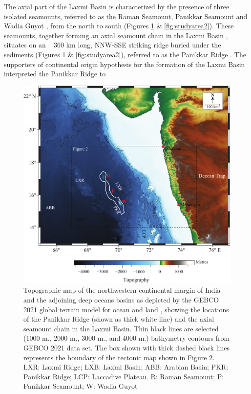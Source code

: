 \documentclass[twocolumn]{article}
\begin{document}
The axial part of the Laxmi Basin is characterized by the presence of three isolated seamounts, referred to as the Raman Seamount, Panikkar Seamount and Wadia Guyot \citep{Bhattacharya1994b}, from the north to south (Figures \ref{fig:studyarea} \& \ref{fig:studyarea2}). These seamounts, together forming an axial seamount chain in the Laxmi Basin \citep{Bhattacharya1994b}, situates on an ~ 360 km long, NNW-SSE striking ridge buried under the sediments (Figures \ref{fig:studyarea} \& \ref{fig:studyarea2}), referred to as the Panikkar Ridge \citep{Gopala_Rao1992}. The supporters of continental origin hypothesis for the formation of the Laxmi Basin interpreted the Panikkar Ridge to\begin{figure}[!htb]
	\centering
	\includegraphics[width=0.85\linewidth]{studyarea-bathy.pdf}
	\caption{
	Topographic map of the northwestern continental margin of India and the adjoining deep oceans basins as depicted by the GEBCO 2021 global terrain model for ocean and land \citep{GEBCO_Compilation_Group2021}, showing the locations of the Panikkar Ridge (shown as thick white line) and the axial seamount chain in the Laxmi Basin. Thin black lines are selected (1000 m., 2000 m., 3000 m., and 4000 m.) bathymetry contours from GEBCO 2021 data set. The box shown with thick dashed black lines represents the boundary of the tectonic map shown in Figure 2. LXR: Laxmi Ridge; LXB: Laxmi Basin; ABB: Arabian Basin; PKR: Panikkar Ridge; LCP: Laccadive Plateau. R: Raman Seamount; P: Panikkar Seamount; W: Wadia Guyot
	}
	\label{fig:studyarea}

\end{figure}
\end{document}
